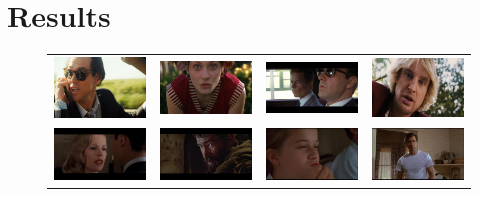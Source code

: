 
\section*{Results}

\begin{figure}
\begin{center}
\begin{tabular}{cccc}
\includegraphics[width=0.15\linewidth]
  {fig/close-ups/01.jpg} 
& \includegraphics[width=0.15\linewidth]
  {fig/close-ups/02.jpg}  
& \includegraphics[width=0.15\linewidth]
  {fig/close-ups/10.jpg}   
& \includegraphics[width=0.15\linewidth]
  {fig/close-ups/15.jpg}
\\
\includegraphics[width=0.15\linewidth]
  {fig/close-ups/05.jpg} 
& \includegraphics[width=0.15\linewidth]
  {fig/close-ups/06.jpg}  
& \includegraphics[width=0.15\linewidth]
  {fig/close-ups/07.jpg}   
& \includegraphics[width=0.15\linewidth]
  {fig/close-ups/08.jpg}
\\


\end{tabular}
\end{center}
\end{figure}
